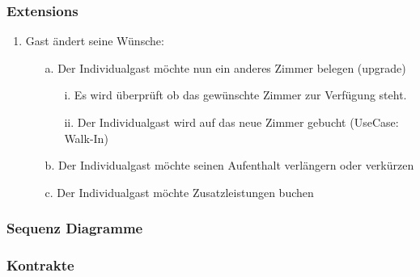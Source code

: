 \documentclass[./detailed_overview_usecases.tex]{subfiles}
\begin{document}
    \subsubsection*{Extensions}
    \begin{enumerate}
        \item Gast ändert seine Wünsche:
        \begin{itemize}
            \item[a.] Der Individualgast möchte nun ein anderes Zimmer belegen (upgrade)
            \begin{itemize}
                \item[i.] Es wird überprüft ob das gewünschte Zimmer zur Verfügung steht.
                \item[ii.] Der Individualgast wird auf das neue Zimmer gebucht (UseCase: Walk-In)
            \end{itemize}
            \item[b.] Der Individualgast möchte seinen Aufenthalt verlängern oder verkürzen
            \item[c.] Der Individualgast möchte Zusatzleistungen buchen
        \end{itemize}
    \end{enumerate}

    \subsubsection{Sequenz Diagramme}
    \subsubsection{Kontrakte}
\end{document}
